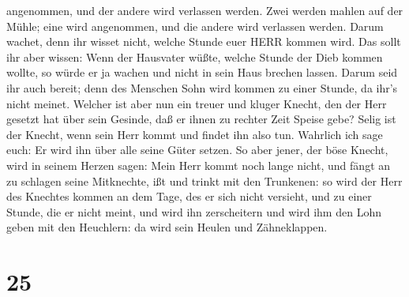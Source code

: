 angenommen, und der andere wird verlassen werden.  Zwei
werden mahlen auf der Mühle; eine wird angenommen, und die andere wird
verlassen werden.  Darum wachet, denn ihr wisset nicht,
welche Stunde euer HERR kommen wird.  Das sollt ihr aber
wissen: Wenn der Hausvater wüßte, welche Stunde der Dieb kommen wollte,
so würde er ja wachen und nicht in sein Haus brechen lassen.
 Darum seid ihr auch bereit; denn des Menschen Sohn wird
kommen zu einer Stunde, da ihr's nicht meinet.  Welcher ist
aber nun ein treuer und kluger Knecht, den der Herr gesetzt hat über
sein Gesinde, daß er ihnen zu rechter Zeit Speise gebe? 
Selig ist der Knecht, wenn sein Herr kommt und findet ihn also tun.
 Wahrlich ich sage euch: Er wird ihn über alle seine Güter
setzen.  So aber jener, der böse Knecht, wird in seinem
Herzen sagen: Mein Herr kommt noch lange nicht,  und fängt
an zu schlagen seine Mitknechte, ißt und trinkt mit den Trunkenen:
 so wird der Herr des Knechtes kommen an dem Tage, des er
sich nicht versieht, und zu einer Stunde, die er nicht meint,
 und wird ihn zerscheitern und wird ihm den Lohn geben mit
den Heuchlern: da wird sein Heulen und Zähneklappen.

\hypertarget{section-24}{%
\section{25}\label{section-24}}

